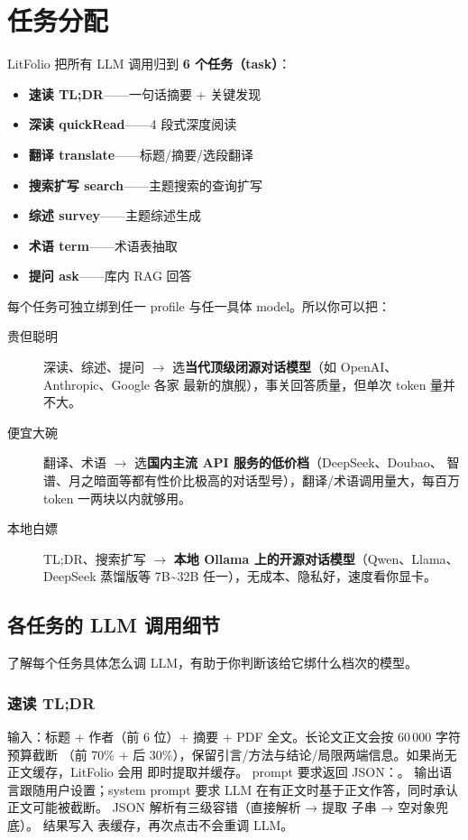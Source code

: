 \section{任务分配}

LitFolio 把所有 LLM 调用归到 \textbf{6 个任务（task）}：

\begin{itemize}
  \item \textbf{速读 TL;DR}——一句话摘要 + 关键发现
  \item \textbf{深读 quickRead}——4 段式深度阅读
  \item \textbf{翻译 translate}——标题/摘要/选段翻译
  \item \textbf{搜索扩写 search}——主题搜索的查询扩写
  \item \textbf{综述 survey}——主题综述生成
  \item \textbf{术语 term}——术语表抽取
  \item \textbf{提问 ask}——库内 RAG 回答
\end{itemize}

每个任务可独立绑到任一 profile 与任一具体 model。所以你可以把：
\begin{description}
  \item[贵但聪明] 深读、综述、提问 \ensuremath{\rightarrow} 选\textbf{当代顶级闭源对话模型}（如 OpenAI、Anthropic、Google 各家
    最新的旗舰），事关回答质量，但单次 token 量并不大。
  \item[便宜大碗] 翻译、术语 \ensuremath{\rightarrow} 选\textbf{国内主流 API 服务的低价档}（DeepSeek、Doubao、
    智谱、月之暗面等都有性价比极高的对话型号），翻译/术语调用量大，每百万 token 一两块以内就够用。
  \item[本地白嫖] TL;DR、搜索扩写 \ensuremath{\rightarrow} \textbf{本地 Ollama 上的开源对话模型}（Qwen、Llama、
    DeepSeek 蒸馏版等 7B\textasciitilde32B 任一），无成本、隐私好，速度看你显卡。
\end{description}

\subsection{各任务的 LLM 调用细节}

了解每个任务具体怎么调 LLM，有助于你判断该给它绑什么档次的模型。

\subsubsection{速读 TL;DR}

输入：标题 + 作者（前 6 位）+ 摘要 + PDF 全文。长论文正文会按 60\,000 字符预算截断
（前 70\% + 后 30\%），保留引言/方法与结论/局限两端信息。如果尚无
 正文缓存，LitFolio 会用  即时提取并缓存。
prompt 要求返回 JSON：。
输出语言跟随用户设置；system prompt 要求 LLM 在有正文时基于正文作答，同时承认正文可能被截断。
JSON 解析有三级容错（直接解析 → 提取  子串 → 空对象兜底）。
结果写入  表缓存，再次点击不会重调 LLM。

